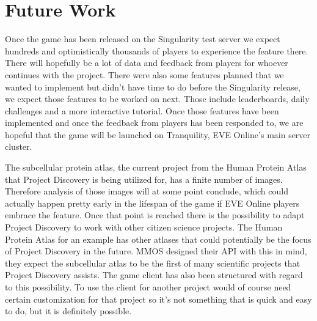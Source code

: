 \section{Future Work}\label{sec:futurework}
Once the game has been released on the Singularity test server we expect hundreds and optimistically thousands of players to experience the feature there. There will hopefully be a lot of data and feedback from players for whoever continues with the project. There were also some features planned that we wanted to implement but didn't have time to do before the Singularity release, we expect those features to be worked on next. Those include leaderboards, daily challenges and a more interactive tutorial. Once those features have been implemented and once the feedback from players has been responded to, we are hopeful that the game will be launched on Tranquility, EVE Online's main server cluster. 

The subcellular protein atlas, the current project from the Human Protein Atlas that Project Discovery is being utilized for, has a finite number of images. Therefore analysis of those images will at some point conclude, which could actually happen pretty early in the lifespan of the game if EVE Online players embrace the feature. Once that point is reached there is the possibility to adapt Project Discovery to work with other citizen science projects. The Human Protein Atlas for an example has other atlases that could potentially be the focus of Project Discovery in the future. MMOS designed their API with this in mind, they expect the subcellular atlas to be the first of many scientific projects that Project Discovery assists. The game client has also been structured with regard to this possibility. To use the client for another project would of course need certain customization for that project so it's not something that is quick and easy to do, but it is definitely possible. 
